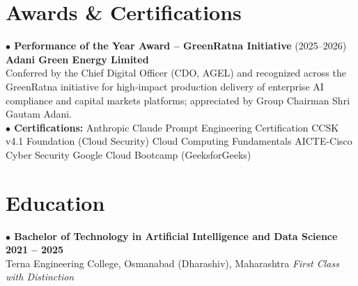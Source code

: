 \documentclass[a4paper,10pt]{article}
\begin{document}
\vspace{5pt}

\section{Awards \& Certifications}
\noindent
\textbf{\normalsize $\bullet$ Performance of the Year Award -- GreenRatna Initiative} (2025--2026) \hfill \textbf{Adani Green Energy Limited} \\
Conferred by the Chief Digital Officer (CDO, AGEL) and recognized across the GreenRatna initiative for high-impact production delivery of enterprise AI compliance and capital markets platforms; appreciated by Group Chairman Shri Gautam Adani. \\[3pt]
\textbf{\normalsize $\bullet$ Certifications:} Anthropic Claude Prompt Engineering Certification \textbar{} CCSK v4.1 Foundation (Cloud Security) \textbar{} Cloud Computing Fundamentals \textbar{} AICTE-Cisco Cyber Security \textbar{} Google Cloud Bootcamp (GeeksforGeeks)

\vspace{5pt}

\section{Education}
\noindent
\textbf{\normalsize $\bullet$ Bachelor of Technology in Artificial Intelligence and Data Science} \hfill \textbf{2021 -- 2025} \\
Terna Engineering College, Osmanabad (Dharashiv), Maharashtra \hfill \textit{First Class with Distinction}
\end{document}
